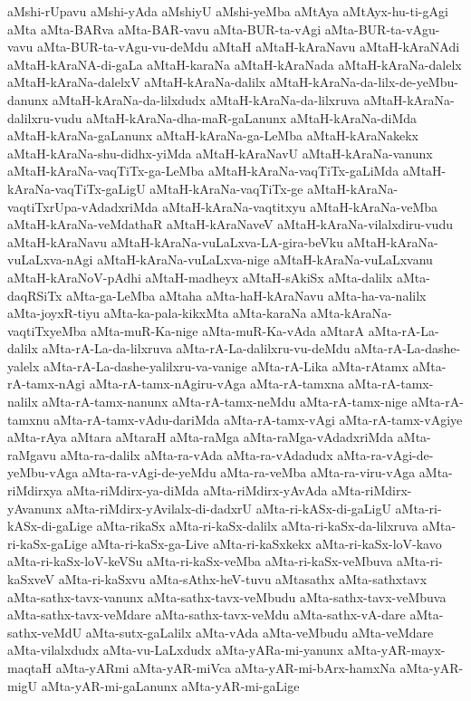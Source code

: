 {aMshi-rUpavu
aMshi-yAda
aMshiyU
aMshi-yeMba
aMtAya
aMtAyx-hu-ti-gAgi
aMta
aMta-BARva
aMta-BAR-vavu
aMta-BUR-ta-vAgi
aMta-BUR-ta-vAgu-vavu
aMta-BUR-ta-vAgu-vu-deMdu
aMtaH
aMtaH-kAraNavu
aMtaH-kAraNAdi
aMtaH-kAraNA-di-gaLa
aMtaH-karaNa
aMtaH-kAraNada
aMtaH-kAraNa-dalelx
aMtaH-kAraNa-dalelxV
aMtaH-kAraNa-dalilx
aMtaH-kAraNa-da-lilx-de-yeMbu-danunx
aMtaH-kAraNa-da-lilxdudx
aMtaH-kAraNa-da-lilxruva
aMtaH-kAraNa-dalilxru-vudu
aMtaH-kAraNa-dha-maR-gaLanunx
aMtaH-kAraNa-diMda
aMtaH-kAraNa-gaLanunx
aMtaH-kAraNa-ga-LeMba
aMtaH-kAraNakekx
aMtaH-kAraNa-shu-didhx-yiMda
aMtaH-kAraNavU
aMtaH-kAraNa-vanunx
aMtaH-kAraNa-vaqTiTx-ga-LeMba
aMtaH-kAraNa-vaqTiTx-gaLiMda
aMtaH-kAraNa-vaqTiTx-gaLigU
aMtaH-kAraNa-vaqTiTx-ge
aMtaH-kAraNa-vaqtiTxrUpa-vAdadxriMda
aMtaH-kAraNa-vaqtitxyu
aMtaH-kAraNa-veMba
aMtaH-kAraNa-veMdathaR
aMtaH-kAraNaveV
aMtaH-kAraNa-vilalxdiru-vudu
aMtaH-kAraNavu
aMtaH-kAraNa-vuLaLxva-LA-gira-beVku
aMtaH-kAraNa-vuLaLxva-nAgi
aMtaH-kAraNa-vuLaLxva-nige
aMtaH-kAraNa-vuLaLxvanu
aMtaH-kAraNoV-pAdhi
aMtaH-madheyx
aMtaH-sAkiSx
aMta-dalilx
aMta-daqRSiTx
aMta-ga-LeMba
aMtaha
aMta-haH-kAraNavu
aMta-ha-va-nalilx
aMta-joyxR-tiyu
aMta-ka-pala-kikxMta
aMta-karaNa
aMta-kAraNa-vaqtiTxyeMba
aMta-muR-Ka-nige
aMta-muR-Ka-vAda
aMtarA
aMta-rA-La-dalilx
aMta-rA-La-da-lilxruva
aMta-rA-La-dalilxru-vu-deMdu
aMta-rA-La-dashe-yalelx
aMta-rA-La-dashe-yalilxru-va-vanige
aMta-rA-Lika
aMta-rAtamx
aMta-rA-tamx-nAgi
aMta-rA-tamx-nAgiru-vAga
aMta-rA-tamxna
aMta-rA-tamx-nalilx
aMta-rA-tamx-nanunx
aMta-rA-tamx-neMdu
aMta-rA-tamx-nige
aMta-rA-tamxnu
aMta-rA-tamx-vAdu-dariMda
aMta-rA-tamx-vAgi
aMta-rA-tamx-vAgiye
aMta-rAya
aMtara
aMtaraH
aMta-raMga
aMta-raMga-vAdadxriMda
aMta-raMgavu
aMta-ra-dalilx
aMta-ra-vAda
aMta-ra-vAdadudx
aMta-ra-vAgi-de-yeMbu-vAga
aMta-ra-vAgi-de-yeMdu
aMta-ra-veMba
aMta-ra-viru-vAga
aMta-riMdirxya
aMta-riMdirx-ya-diMda
aMta-riMdirx-yAvAda
aMta-riMdirx-yAvanunx
aMta-riMdirx-yAvilalx-di-dadxrU
aMta-ri-kASx-di-gaLigU
aMta-ri-kASx-di-gaLige
aMta-rikaSx
aMta-ri-kaSx-dalilx
aMta-ri-kaSx-da-lilxruva
aMta-ri-kaSx-gaLige
aMta-ri-kaSx-ga-Live
aMta-ri-kaSxkekx
aMta-ri-kaSx-loV-kavo
aMta-ri-kaSx-loV-keVSu
aMta-ri-kaSx-veMba
aMta-ri-kaSx-veMbuva
aMta-ri-kaSxveV
aMta-ri-kaSxvu
aMta-sAthx-heV-tuvu
aMtasathx
aMta-sathxtavx
aMta-sathx-tavx-vanunx
aMta-sathx-tavx-veMbudu
aMta-sathx-tavx-veMbuva
aMta-sathx-tavx-veMdare
aMta-sathx-tavx-veMdu
aMta-sathx-vA-dare
aMta-sathx-veMdU
aMta-sutx-gaLalilx
aMta-vAda
aMta-veMbudu
aMta-veMdare
aMta-vilalxdudx
aMta-vu-LaLxdudx
aMta-yARa-mi-yanunx
aMta-yAR-mayx-maqtaH
aMta-yARmi
aMta-yAR-miVca
aMta-yAR-mi-bArx-hamxNa
aMta-yAR-migU
aMta-yAR-mi-gaLanunx
aMta-yAR-mi-gaLige
}
